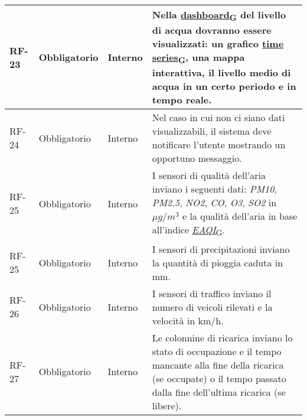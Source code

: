 \begin{longtable}{|>{\centering\arraybackslash}m{}|>{\centering\arraybackslash}m{}|>{\centering\arraybackslash}m{}|>{\centering\arraybackslash}m{}|}
	RF-23           & Obbligatorio        & Interno        & Nella \href{https://7last.github.io/docs/rtb/documentazione-interna/glossario\#dashboard}{dashboard\textsubscript{G}} del livello di acqua dovranno essere visualizzati: un grafico \href{https://7last.github.io/docs/rtb/documentazione-interna/glossario\#time-series}{time series\textsubscript{G}}, una mappa interattiva, il livello medio di acqua in un certo periodo e in tempo reale.                                                                                                                       \\\hline
	RF-24           & Obbligatorio        & Interno        & Nel caso in cui non ci siano dati visualizzabili, il sistema deve notificare l'utente mostrando un opportuno messaggio.                                                                                                                                                                                 \\\hline
	RF-25           & Obbligatorio        & Interno        & I sensori di qualità dell'aria inviano i seguenti dati: \textit{PM10}, \textit{PM2.5}, \textit{NO2}, \textit{CO}, \textit{O3}, \textit{SO2} in $\mu g/m^3$ e la qualità dell'aria in base all'indice \href{https://7last.github.io/docs/rtb/documentazione-interna/glossario\#european-air-quality-index}{\textit{EAQI}\textsubscript{G}}.                                                                                      \\\hline
	RF-25           & Obbligatorio        & Interno        & I sensori di precipitazioni inviano la quantità di pioggia caduta in mm.                                                                                                                                                                                                                                \\\hline
	RF-26           & Obbligatorio        & Interno        & I sensori di traffico inviano il numero di veicoli rilevati e la velocità in km/h.                                                                                                                                                                                                                      \\\hline
	RF-27           & Obbligatorio        & Interno        & Le colonnine di ricarica inviano lo stato di occupazione e il tempo mancante alla fine della ricarica (se occupate) o il tempo passato dalla fine dell'ultima ricarica (se libere).                                                                                                                     \\\hline

\end{longtable}
